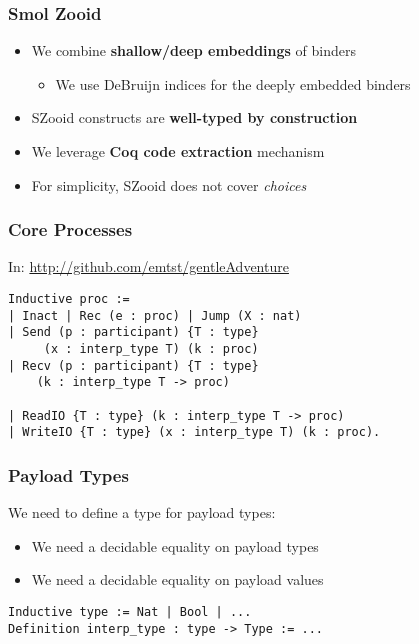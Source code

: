 \begin{frame}
    \frametitle{Smol Zooid}
    \begin{greenbox}{}
    \begin{itemize}
    \item We combine \textbf{shallow/deep embeddings} of binders
    \begin{itemize}
    \item We use DeBruijn indices for the deeply embedded binders
    \end{itemize}
    \item SZooid constructs are \textbf{well-typed by construction}
    \item We leverage \textbf{Coq code extraction} mechanism
    \item For simplicity, SZooid does not cover \emph{choices}
    \end{itemize}
    \end{greenbox}
\end{frame}

\begin{frame}[fragile]
    \frametitle{Core Processes}
    In: \url{http://github.com/emtst/gentleAdventure}
\vspace{.5cm}
    \begin{verbatim}
Inductive proc :=
| Inact | Rec (e : proc) | Jump (X : nat)
| Send (p : participant) {T : type}
     (x : interp_type T) (k : proc)
| Recv (p : participant) {T : type}
    (k : interp_type T -> proc)

| ReadIO {T : type} (k : interp_type T -> proc)
| WriteIO {T : type} (x : interp_type T) (k : proc).
    \end{verbatim}    
\end{frame}

\begin{frame}[fragile]
    \frametitle{Payload Types}
    We need to define a type for payload types:
    \begin{itemize}
    \item We need a decidable equality on payload types
    \item We need a decidable equality on payload values
    \end{itemize}
\vspace{1cm}
    \begin{verbatim}
Inductive type := Nat | Bool | ...
Definition interp_type : type -> Type := ...
    \end{verbatim}
\end{frame}

